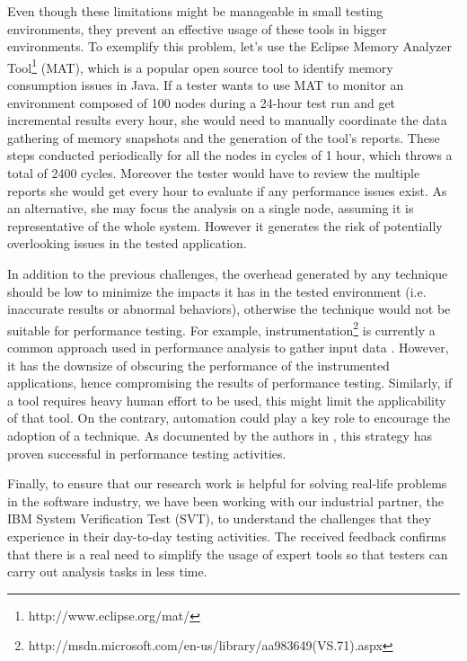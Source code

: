 \documentclass[runningheads,a4paper]{llncs}
\begin{document}
Even though these limitations might be manageable in small testing environments,
they prevent an effective usage of these tools in bigger environments. To
exemplify this problem, let's use the Eclipse Memory Analyzer
Tool\footnote{http://www.eclipse.org/mat/} (MAT), which is a popular open source
tool to identify memory consumption issues in Java. If a tester wants to use MAT
to monitor an environment composed of 100 nodes during a 24-hour test run and 
get incremental results every hour, she would need to manually coordinate the
data gathering of memory snapshots and the generation of the tool's reports.
These steps conducted periodically for all the nodes in cycles of 1 hour, which
throws a total of 2400 cycles. Moreover the tester would have to review the
multiple reports she would get every hour to evaluate if any performance issues
exist. As an alternative, she may focus the analysis on a single node, assuming
it is representative of the whole system. However it generates the risk of
potentially overlooking issues in the tested application.

In addition to the previous challenges, the overhead generated by any technique
should be low to minimize the impacts it has in the tested environment (i.e.
inaccurate results or abnormal behaviors), otherwise the technique would not be
suitable for performance testing. For example,
instrumentation\footnote{http://msdn.microsoft.com/en-us/library/aa983649(VS.71).aspx}
is currently a common approach used in performance analysis to gather input data
\cite{Yang1,Hangal1,Csallner1,Chen2}. However, it has the downsize of obscuring
the performance of the instrumented applications, hence compromising the results of 
performance testing. Similarly, if a tool requires heavy human effort to be
used, this might limit the applicability of that tool. On the contrary, automation 
could play a key role to encourage the adoption of a technique. As documented by
the authors in \cite{Shahamiri1}, this strategy has proven successful in
performance testing activities.

Finally, to ensure that our research work is helpful for solving real-life
problems in the software industry, we have been working with our industrial
partner, the IBM System Verification Test (SVT), to understand the challenges
that they experience in their day-to-day testing activities. The received
feedback confirms that there is a real need to simplify the usage of expert
tools so that testers can carry out analysis tasks in less time.
\end{document}
